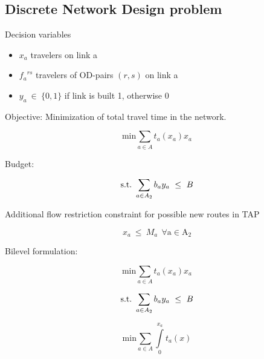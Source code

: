 \documentclass[a4paper, 12pt]{article}
\begin{document}
\subsection{Discrete Network Design problem}
Decision variables
\begin{itemize}
\item $x_{a}$ travelers on link a
\item ${f_{a}}^{rs}$ travelers of OD-pairs $\left(r,s\right)$ on link a
\item $y_{a}\ \in\ {\{}0,1{\}}$ if link is built 1, otherwise 0
\end{itemize}
Objective: Minimization of total travel time in the network.
\begin{large}
\boldmath\begin{equation*}
\mathrm{min}\sum_{a\in{A}} t_{a}\left(x_{a}\right)x_{a} 
\end{equation*}
\end{large}
Budget:
\begin{large}
\boldmath\begin{equation*}
\mathrm{s.t.}\ \sum_{a\in{A_{2}}} b_{a}y_{a}\ \leq \ B \\
\end{equation*}
\end{large}
Additional flow restriction constraint for possible new routes in TAP
\begin{large}
\boldmath\begin{equation*}
x_{a}\ \leq\ M_{a}\ \ \mathrm{\forall{a}\in{A_{2}}}
\end{equation*}
\end{large} 
Bilevel formulation:
\begin{large}
\boldmath\begin{equation*}
\mathrm{min}\sum_{a\in{A}} t_{a}\left(x_{a}\right)x_{a} 
\end{equation*}
\end{large}
\begin{large}
\boldmath\begin{equation*}
\mathrm{s.t.}\ \sum_{a\in{A_{2}}} b_{a}y_{a}\ \leq \ B \\
\end{equation*}
\end{large}
\begin{large}
\boldmath\begin{equation*}
\mathrm{min}\sum_{a\in{A}} \int\limits_{0}^{x_a}t_{a}\left(x\right)
\end{equation*}
\end{large}
\end{document}
